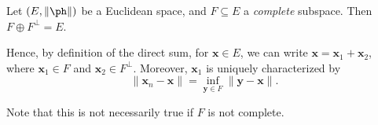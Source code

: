\documentclass[a4paper]{article}
\begin{document}
\begin{thm}
  Let $(E, \|\ph\|)$ be a Euclidean space, and $F\subseteq E$ a \emph{complete} subspace. Then $F \oplus F^\perp = E$.

  Hence, by definition of the direct sum, for $\mathbf{x} \in E$, we can write $\mathbf{x} = \mathbf{x}_1 + \mathbf{x}_2$, where $\mathbf{x}_1 \in F$ and $\mathbf{x}_2 \in F^\perp$. Moreover, $\mathbf{x}_1$ is uniquely characterized by
  \[
    \|\mathbf{x}_n - \mathbf{x}\| = \inf_{\mathbf{y} \in F} \|\mathbf{y\mathbf{}} - \mathbf{x}\|.
  \]
\end{thm}
\begin{center}
\end{center}
Note that this is not necessarily true if $F$ is not complete.
\end{document}
